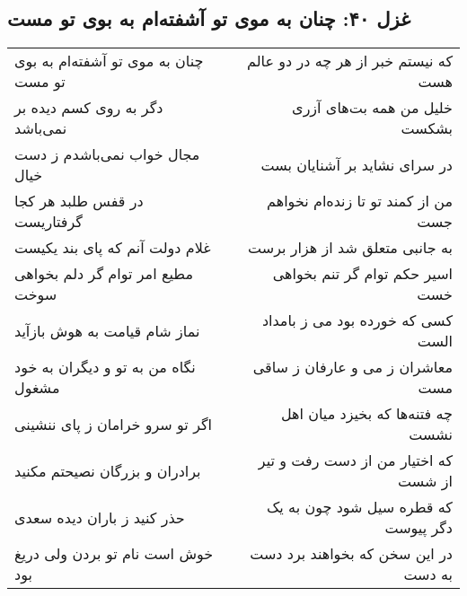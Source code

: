 \begin{center}
\section*{غزل ۴۰: چنان به موی تو آشفته‌ام به بوی تو مست}
\label{sec:040}
\begin{longtable}{l p{0.5cm} r}
چنان به موی تو آشفته‌ام به بوی تو مست
&&
که نیستم خبر از هر چه در دو عالم هست
\\
دگر به روی کسم دیده بر نمی‌باشد
&&
خلیل من همه بت‌های آزری بشکست
\\
مجال خواب نمی‌باشدم ز دست خیال
&&
در سرای نشاید بر آشنایان بست
\\
در قفس طلبد هر کجا گرفتاریست
&&
من از کمند تو تا زنده‌ام نخواهم جست
\\
غلام دولت آنم که پای بند یکیست
&&
به جانبی متعلق شد از هزار برست
\\
مطیع امر توام گر دلم بخواهی سوخت
&&
اسیر حکم توام گر تنم بخواهی خست
\\
نماز شام قیامت به هوش بازآید
&&
کسی که خورده بود می ز بامداد الست
\\
نگاه من به تو و دیگران به خود مشغول
&&
معاشران ز می و عارفان ز ساقی مست
\\
اگر تو سرو خرامان ز پای ننشینی
&&
چه فتنه‌ها که بخیزد میان اهل نشست
\\
برادران و بزرگان نصیحتم مکنید
&&
که اختیار من از دست رفت و تیر از شست
\\
حذر کنید ز باران دیده سعدی
&&
که قطره سیل شود چون به یک دگر پیوست
\\
خوش است نام تو بردن ولی دریغ بود
&&
در این سخن که بخواهند برد دست به دست
\\
\end{longtable}
\end{center}
